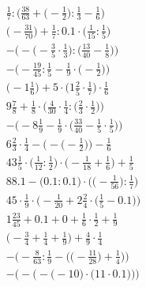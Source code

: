 \documentclass[8pt]{article}
\begin{document}
\begin{align}
\frac{1}{7} : \Big(\frac{38}{63} + \big(-\frac{1}{2}\big) : \frac{1}{3} - \frac{1}{6}\Big) \\
\big(-\frac{31}{70}\big) + \frac{1}{7} : 0.1 \cdot \big(\frac{1}{15} : \frac{1}{5}\big) \\
-\Big(-\big(-\frac{3}{5} \cdot \frac{1}{3}\big) : \big(\frac{13}{40} - \frac{1}{8}\big)\Big) \\
-\Big(-\frac{19}{45} : \frac{1}{5} - \frac{1}{9} \cdot \big(-\frac{1}{2}\big)\Big) \\
\big(-1\frac{1}{6}\big) + 5 \cdot \big(1\frac{2}{5} \cdot \frac{1}{7}\big) \cdot \frac{1}{6} \\
9\frac{7}{8} + \frac{1}{8} \cdot \Big(\frac{4}{30} \cdot \frac{1}{4} : \big(\frac{2}{3} \cdot \frac{1}{2}\big)\Big) \\
-\Big(-8\frac{1}{9} - \frac{1}{9} \cdot \big(\frac{33}{40} - \frac{1}{5} \cdot \frac{1}{5}\big)\Big) \\
6\frac{2}{3} \cdot \frac{1}{4} - \Big(-\big(-\frac{1}{2}\big)\Big) - \frac{1}{6} \\
43\frac{1}{5} \cdot \big(\frac{1}{12} : \frac{1}{2}\big) \cdot \big(-\frac{1}{18} + \frac{1}{6}\big) + \frac{1}{5} \\
88.1 - \Big(0.1 : 0.1\Big) \cdot \Big(\big(-\frac{1}{56}\big) : \frac{1}{7}\Big) \\
45 \cdot \frac{1}{9} \cdot \Big(-\frac{1}{20} + 2\frac{2}{4} \cdot \big(\frac{1}{5} - 0.1\big)\Big) \\
1\frac{23}{45} + 0.1 + 0 + \frac{1}{6} \cdot \frac{1}{2} + \frac{1}{9} \\
\big(-\frac{3}{4} + \frac{1}{4} + \frac{1}{9}\big) + \frac{4}{9} \cdot \frac{1}{4} \\
-\bigg(-\frac{8}{63} : \frac{1}{9} - \Big(\big(-\frac{11}{28}\big) + \frac{1}{4}\Big)\bigg) \\
-\bigg(-\Big(-\big(-10\big) \cdot \big(11 \cdot 0.1\big)\Big)\bigg)
\end{align}
\end{document}
